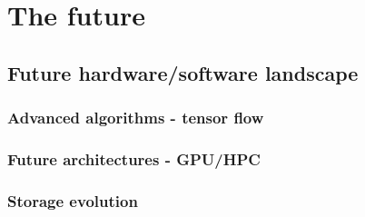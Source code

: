 
%
\chapter{The future} 
\section{Future hardware/software landscape}
\subsection{Advanced algorithms - tensor flow}
\subsection{Future architectures - GPU/HPC}
\subsection{Storage evolution}
